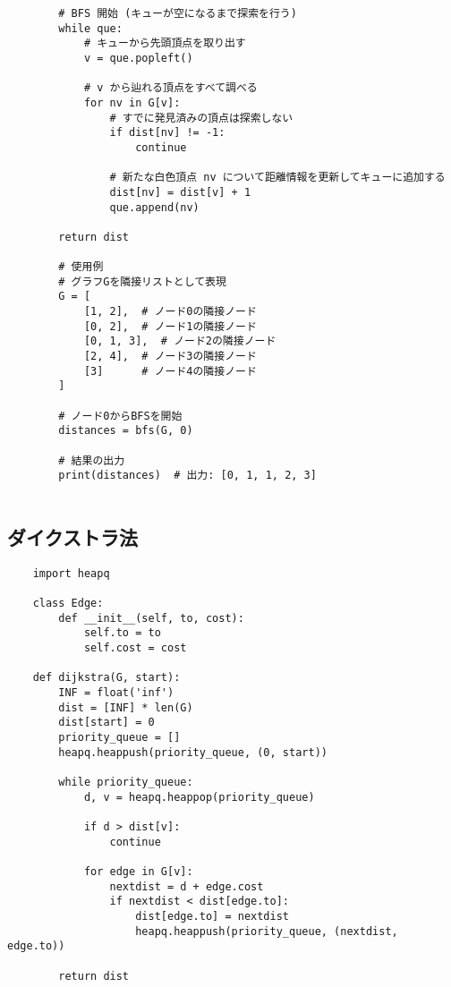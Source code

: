\documentclass[a4paper, landscape, 9pt]{jarticle} %
\begin{document}
\begin{multicols*}{3}
\begin{lstlisting}
        # BFS 開始 (キューが空になるまで探索を行う)
        while que:
            # キューから先頭頂点を取り出す
            v = que.popleft()
    
            # v から辿れる頂点をすべて調べる
            for nv in G[v]:
                # すでに発見済みの頂点は探索しない
                if dist[nv] != -1:
                    continue
    
                # 新たな白色頂点 nv について距離情報を更新してキューに追加する
                dist[nv] = dist[v] + 1
                que.append(nv)
    
        return dist
        
        # 使用例
        # グラフGを隣接リストとして表現
        G = [
            [1, 2],  # ノード0の隣接ノード
            [0, 2],  # ノード1の隣接ノード
            [0, 1, 3],  # ノード2の隣接ノード
            [2, 4],  # ノード3の隣接ノード
            [3]      # ノード4の隣接ノード
        ]
        
        # ノード0からBFSを開始
        distances = bfs(G, 0)
        
        # 結果の出力
        print(distances)  # 出力: [0, 1, 1, 2, 3]
        
    \end{lstlisting}

    \subsection{ダイクストラ法}
    \begin{lstlisting}
    import heapq

    class Edge:
        def __init__(self, to, cost):
            self.to = to
            self.cost = cost
    
    def dijkstra(G, start):
        INF = float('inf')
        dist = [INF] * len(G)
        dist[start] = 0
        priority_queue = []
        heapq.heappush(priority_queue, (0, start))
    
        while priority_queue:
            d, v = heapq.heappop(priority_queue)
    
            if d > dist[v]:
                continue
    
            for edge in G[v]:
                nextdist = d + edge.cost
                if nextdist < dist[edge.to]:
                    dist[edge.to] = nextdist
                    heapq.heappush(priority_queue, (nextdist, edge.to))
    
        return dist
        

\end{lstlisting}
\end{multicols*}
\end{document}
